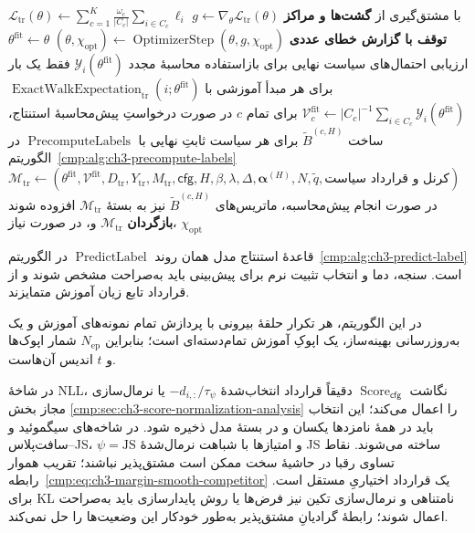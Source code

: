 \begin{algorithm}[!htbp]
\begin{algorithmic}[1]
            \ENDIF
        \ENDIF
    \ENDFOR
    \STATE $\mathcal L_{\mathrm{tr}}(\theta)\gets
    \sum_{c=1}^{K}\frac{\omega_c}{|C_c|}
    \sum_{i\in C_c}\ell_i$
    \STATE $g\gets\nabla_\theta\mathcal L_{\mathrm{tr}}(\theta)$
    با مشتق‌گیری از \textbf{گشت‌ها و مراکز}
        \STATE \textbf{توقف با گزارش خطای عددی}
    \ENDIF
    \STATE $(\theta,\chi_{\mathrm{opt}})\gets
    \operatorname{OptimizerStep}(\theta,g,\chi_{\mathrm{opt}})$
\ENDFOR
\STATE $\theta^{\mathrm{fit}}\gets\theta$
\STATE ارزیابی احتمال‌های سیاست نهایی برای بازاستفاده
\STATE محاسبهٔ مجدد
$\mathscr Y_i(\theta^{\mathrm{fit}})$
فقط یک بار برای هر مبدأ آموزشی با
$\operatorname{ExactWalkExpectation}_{\mathrm{tr}}(i;\theta^{\mathrm{fit}})$
\STATE $\mathcal V_c^{\mathrm{fit}}\gets
|C_c|^{-1}\sum_{i\in C_c}
\mathscr Y_i(\theta^{\mathrm{fit}})$
برای تمام $c$
\STATE در صورت درخواستِ پیش‌محاسبهٔ
استنتاج، ساخت $\widetilde B^{(c,H)}$
برای هر سیاست ثابتِ نهایی با
$\operatorname{PrecomputeLabels}$
در الگوریتم~\ref{cmp:alg:ch3-precompute-labels}
\STATE $\mathcal M_{\mathrm{tr}}\gets
(\theta^{\mathrm{fit}},\mathcal V^{\mathrm{fit}},
D_{\mathrm{tr}},Y_{\mathrm{tr}},M_{\mathrm{tr}},
\mathsf{cfg},H,\beta,\lambda,\Delta,
\boldsymbol\alpha^{(H)},N,\widetilde q,\text{کرنل و قرارداد سیاست})$
\STATE در صورت انجام پیش‌محاسبه،
ماتریس‌های $\widetilde B^{(c,H)}$
نیز به بستهٔ $\mathcal M_{\mathrm{tr}}$ افزوده شوند
\STATE \textbf{بازگردان}
$\mathcal M_{\mathrm{tr}}$ و، در صورت نیاز، $\chi_{\mathrm{opt}}$
\end{algorithmic}
\end{algorithm}

قاعدهٔ استنتاج مدل همان روند
$\operatorname{PredictLabel}$ در
الگوریتم~\ref{cmp:alg:ch3-predict-label} است.
سنجه، دما و انتخاب تثبیت نرم برای پیش‌بینی باید
به‌صراحت مشخص شوند و از قرارداد تابع زیان آموزش
متمایزند.

در این الگوریتم، هر تکرار حلقهٔ بیرونی با پردازش تمام نمونه‌های آموزش
و یک به‌روزرسانی بهینه‌ساز، یک اپوکِ آموزش تمام‌دسته‌ای است؛
بنابراین $N_{\mathrm{ep}}$ شمار اپوک‌ها و $t$ اندیس آن‌هاست.

در شاخهٔ NLL، نگاشت
$\operatorname{Score}_{\mathsf{cfg}}$
دقیقاً قرارداد انتخاب‌شدهٔ
$-d_{i,:}/\tau_\psi$ یا نرمال‌سازی مجاز بخش
\ref{cmp:sec:ch3-score-normalization-analysis}
را اعمال می‌کند؛ این انتخاب باید در همهٔ
نامزدها یکسان و در بستهٔ مدل ذخیره شود.
در شاخه‌های سیگموئید و سافت‌پلاس--JS،
$\psi=\mathrm{JS}$ و امتیازها با
شباهت نرمال‌شدهٔ JS ساخته می‌شوند.
نقاط تساوی رقبا در حاشیهٔ سخت ممکن است
مشتق‌پذیر نباشند؛ تقریب هموار
رابطه~\eqref{cmp:eq:ch3-margin-smooth-competitor}
یک قرارداد اختیاریِ مستقل است.
برای KL نامتناهی و نرمال‌سازی تکین نیز
فرض‌ها یا روش پایدارسازی باید به‌صراحت
اعمال شوند؛ رابطهٔ گرادیانِ مشتق‌پذیر
به‌طور خودکار این وضعیت‌ها را حل نمی‌کند.

